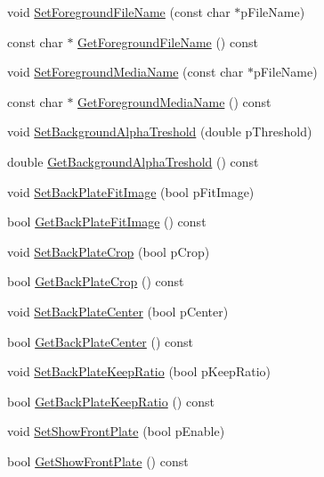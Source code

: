 \begin{DoxyCompactItemize}
\item 
void \hyperlink{class_fbx_camera_abe02de6350eda0abc858e09b994fffb4}{Set\+Foreground\+File\+Name} (const char $\ast$p\+File\+Name)
\item 
const char $\ast$ \hyperlink{class_fbx_camera_abe9513ba9360600c1691e9e96310ee85}{Get\+Foreground\+File\+Name} () const
\item 
void \hyperlink{class_fbx_camera_ac6713ad08d35b84585b44855c8be04b9}{Set\+Foreground\+Media\+Name} (const char $\ast$p\+File\+Name)
\item 
const char $\ast$ \hyperlink{class_fbx_camera_a3ce6171880a10098f2b3bc21e0ee5427}{Get\+Foreground\+Media\+Name} () const
\item 
void \hyperlink{class_fbx_camera_af6c1bf8cdcb03513a1aac3d547c79c10}{Set\+Background\+Alpha\+Treshold} (double p\+Threshold)
\item 
double \hyperlink{class_fbx_camera_ad8dd3ac058eae9dab18e43896fbda3ad}{Get\+Background\+Alpha\+Treshold} () const
\item 
void \hyperlink{class_fbx_camera_a05d48b887476bb61460f50d34721642d}{Set\+Back\+Plate\+Fit\+Image} (bool p\+Fit\+Image)
\item 
bool \hyperlink{class_fbx_camera_a5174e9fbec62fa007eb86d3e5c7ef70f}{Get\+Back\+Plate\+Fit\+Image} () const
\item 
void \hyperlink{class_fbx_camera_ab5f5ab76b27d70b61a256c364f183024}{Set\+Back\+Plate\+Crop} (bool p\+Crop)
\item 
bool \hyperlink{class_fbx_camera_a76021d40416efffd5bffcf462741bada}{Get\+Back\+Plate\+Crop} () const
\item 
void \hyperlink{class_fbx_camera_a73af7339e5a68e655a930b2e9570e24d}{Set\+Back\+Plate\+Center} (bool p\+Center)
\item 
bool \hyperlink{class_fbx_camera_a9313551dcd023e3b47e29b8a899f1f23}{Get\+Back\+Plate\+Center} () const
\item 
void \hyperlink{class_fbx_camera_ad60007e61d4a9ca5e3f4434beebdca95}{Set\+Back\+Plate\+Keep\+Ratio} (bool p\+Keep\+Ratio)
\item 
bool \hyperlink{class_fbx_camera_a44d26a393e58fec107643992dd3bb439}{Get\+Back\+Plate\+Keep\+Ratio} () const
\item 
void \hyperlink{class_fbx_camera_a68f728e9e8fea2ab93f2b050841b4d75}{Set\+Show\+Front\+Plate} (bool p\+Enable)
\item 
bool \hyperlink{class_fbx_camera_ab21048c80c2139f248b1c75cb79fae0b}{Get\+Show\+Front\+Plate} () const
\item 

\end{DoxyCompactItemize}
